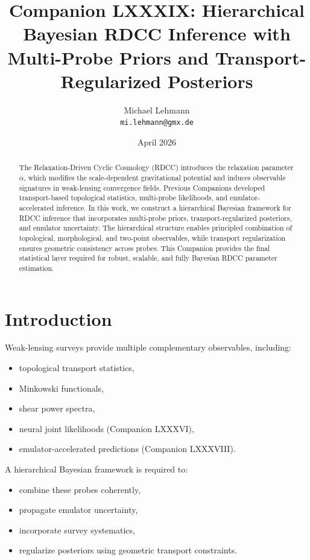 \documentclass[11pt,a4paper]{article}
\title{\textbf{Companion LXXXIX: Hierarchical Bayesian RDCC Inference with Multi-Probe Priors and Transport-Regularized Posteriors}}
\author{Michael Lehmann \\ \texttt{mi.lehmann@gmx.de}}
\date{April 2026}
\begin{document}
\maketitle

\begin{abstract}
The Relaxation-Driven Cyclic Cosmology (RDCC) introduces the relaxation parameter 
$\alpha$, which modifies the scale-dependent gravitational potential and induces 
observable signatures in weak-lensing convergence fields. Previous Companions 
developed transport-based topological statistics, multi-probe likelihoods, and 
emulator-accelerated inference. In this work, we construct a hierarchical Bayesian 
framework for RDCC inference that incorporates multi-probe priors, 
transport-regularized posteriors, and emulator uncertainty. The hierarchical 
structure enables principled combination of topological, morphological, and 
two-point observables, while transport regularization ensures geometric 
consistency across probes. This Companion provides the final statistical layer 
required for robust, scalable, and fully Bayesian RDCC parameter estimation.
\end{abstract}
\section{Introduction}

Weak-lensing surveys provide multiple complementary observables, including:

\begin{itemize}
    \item topological transport statistics,
    \item Minkowski functionals,
    \item shear power spectra,
    \item neural joint likelihoods (Companion LXXXVI),
    \item emulator-accelerated predictions (Companion LXXXVIII).
\end{itemize}

A hierarchical Bayesian framework is required to:

\begin{itemize}
    \item combine these probes coherently,
    \item propagate emulator uncertainty,
    \item incorporate survey systematics,
    \item regularize posteriors using geometric transport constraints.
\end{itemize}
\end{document}
